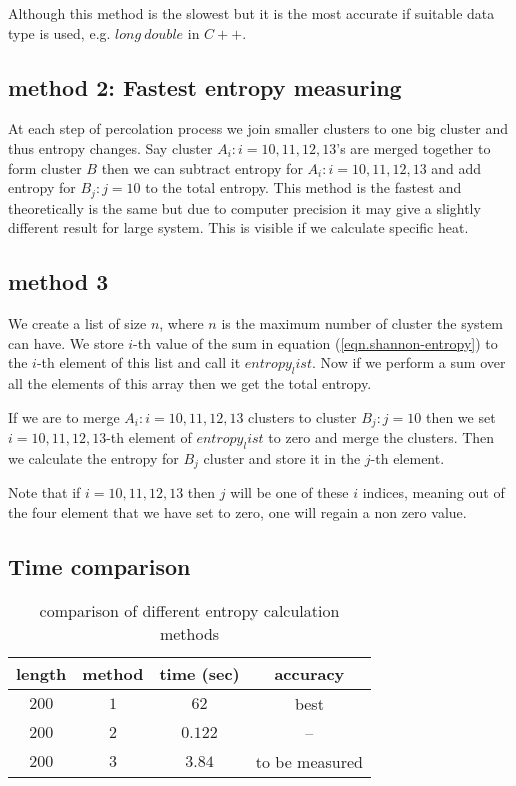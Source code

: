 	Although this method is the slowest but it is the most accurate if suitable data type is used, e.g. $long\ double$ in $C++$.
	
	\subsection{method 2: Fastest entropy measuring}
	At each step of percolation process we join smaller clusters to one big cluster and thus entropy changes. Say cluster $A_i : i={10,11,12,13}$'s are merged together to form cluster $B$ then we can subtract entropy for $A_i : i={10,11,12,13}$ and add entropy for $B_j : j = {10}$ to the total entropy. This method is the fastest and theoretically is the same but due to computer precision it may give a slightly different result for large system. This is visible if we calculate specific heat.
	
	\subsection{method 3}
	We create a list of size $n$, where $n$ is the maximum number of cluster the system can have. We store $i$-th value of the sum in equation (\ref{eqn.shannon-entropy}) to the $i$-th element of this list and call it $entropy_list$. 
	Now if we perform a sum over all the elements of this array then we get the total entropy.
	
	If we are to merge $A_i : i={10,11,12,13}$ clusters to cluster $B_j : j = {10}$ then we set $i={10,11,12,13}$-th element of $entropy_list$ to zero and merge the clusters. Then we calculate the entropy for $B_j$ cluster and store it in the $j$-th element.
	
	Note that if $i={10,11,12,13}$ then $j$ will be one of these $i$ indices, meaning out of the four element that we have set to zero, one will regain a non zero value.
	
	\subsection{Time comparison}
	\begin{table}
		\centering
		\begin{tabular}{c|c|c|c}
			length & method &  time (sec) & accuracy \\
			\hline
			$200$ & $1$ & $62$ & best\\
			$200$ & $2$ & $0.122$ &	--\\
			$200$ & $3$ & $3.84$ & to be measured
		\end{tabular}
	\caption{comparison of different entropy calculation methods}
	\end{table}

%
